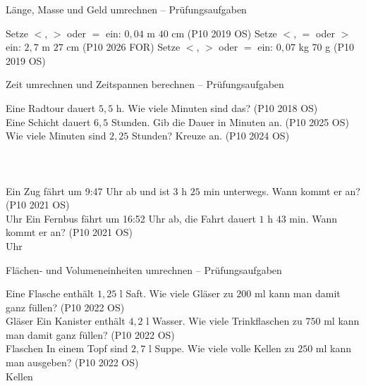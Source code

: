 \setcounter{aufgabe}{20}

\begin{aufgabe}{Länge, Masse und Geld umrechnen – Prüfungsaufgaben}
\begin{teile}
\teil Setze $<$, $>$ oder $=$ ein: $0{,}04$ m \leerfeld $40$ cm \hfill (P10 2019 OS)
\teil Setze $<$, $=$ oder $>$ ein: $2{,}7$ m \leerfeld $27$ cm \hfill (P10 2026 FOR)
\teil Setze $<$, $>$ oder $=$ ein: $0{,}07$ kg \leerfeld $70$ g \hfill (P10 2019 OS)
\end{teile}
\end{aufgabe}

\begin{aufgabe}{Zeit umrechnen und Zeitspannen berechnen – Prüfungsaufgaben}
\begin{teile}
\teil Eine Radtour dauert $5{,}5$ h. Wie viele Minuten sind das? \hfill (P10 2018 OS) \\ \leerfeld[min]
\teil Eine Schicht dauert $6{,}5$ Stunden. Gib die Dauer in Minuten an. \hfill (P10 2025 OS) \\ \leerfeld[min]
\teil Wie viele Minuten sind $2{,}25$ Stunden? Kreuze an. \hfill (P10 2024 OS)\\ \\ \\ \\ 
\teil Ein Zug fährt um 9:47 Uhr ab und ist $3$ h $25$ min unterwegs. Wann kommt er an? \hfill (P10 2021 OS) \\ \leerfeld Uhr
\teil Ein Fernbus fährt um 16:52 Uhr ab, die Fahrt dauert $1$ h $43$ min. Wann kommt er an? \hfill (P10 2021 OS) \\ \leerfeld Uhr
\end{teile}
\end{aufgabe}

\begin{aufgabe}{Flächen- und Volumeneinheiten umrechnen – Prüfungsaufgaben}
\begin{teile}
\teil Eine Flasche enthält $1{,}25$ l Saft. Wie viele Gläser zu $200$ ml kann man damit ganz füllen? \hfill (P10 2022 OS) \\ \leerfeld Gläser
\teil Ein Kanister enthält $4{,}2$ l Wasser. Wie viele Trinkflaschen zu $750$ ml kann man damit ganz füllen? \hfill (P10 2022 OS) \\ \leerfeld Flaschen
\teil In einem Topf sind $2{,}7$ l Suppe. Wie viele volle Kellen zu $250$ ml kann man ausgeben? \hfill (P10 2022 OS) \\ \leerfeld Kellen
\end{teile}
\end{aufgabe}
